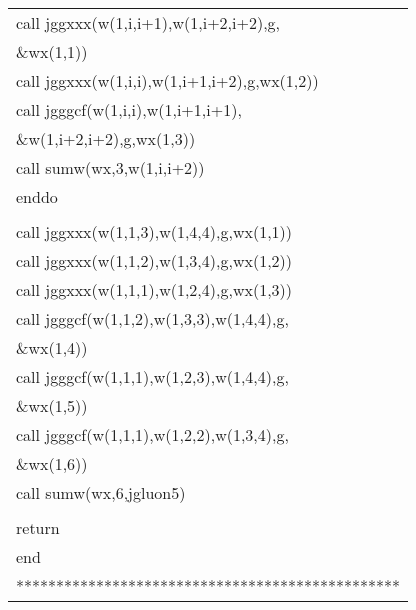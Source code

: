 \begin{center}
{\begin{supertabular}{l}
       \hspace{1em}   call jggxxx(w(1,i,i+1),w(1,i+2,i+2),g,\\
       \&\hspace{7em}wx(1,1))  \\
       \hspace{1em}    call jggxxx(w(1,i,i),w(1,i+1,i+2),g,wx(1,2))      \\
       \hspace{1em}    call jgggcf(w(1,i,i),w(1,i+1,i+1),\\
       \&\hspace{7em}w(1,i+2,i+2),g,wx(1,3))\\
       \hspace{1em}    call sumw(wx,3,w(1,i,i+2))\\
       \hspace{0.5em} enddo\\
      \\
      \hspace{0.5em} call jggxxx(w(1,1,3),w(1,4,4),g,wx(1,1))  \\
      \hspace{0.5em} call jggxxx(w(1,1,2),w(1,3,4),g,wx(1,2))    \\
      \hspace{0.5em} call jggxxx(w(1,1,1),w(1,2,4),g,wx(1,3))      \\
      \hspace{0.5em} call jgggcf(w(1,1,2),w(1,3,3),w(1,4,4),g,\\
      \&\hspace{6.5em}wx(1,4)) \\
      \hspace{0.5em} call jgggcf(w(1,1,1),w(1,2,3),w(1,4,4),g,\\
      \&\hspace{6.5em}wx(1,5))   \\
      \hspace{0.5em} call jgggcf(w(1,1,1),w(1,2,2),w(1,3,4),g,\\
      \&\hspace{6.5em}wx(1,6))     \\
      \hspace{0.5em} call sumw(wx,6,jgluon5)\\
 \\
     \hspace{0.5em} return\\
     \hspace{0.5em} end\\
************************************************\\
\end{supertabular}
}
\end{center}

